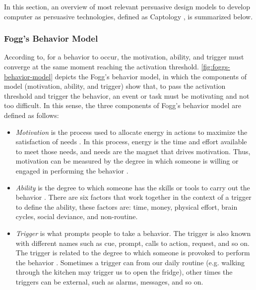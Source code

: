 In this section, an overview of most relevant persuasive design models to develop computer as persuasive technologies, defined as Captology \cite{Fogg2002}, is summarized below.

\subsubsection{Fogg's Behavior Model}
\label{subsubsec:fogg-behavior-model}

According to, for a behavior to occur, the motivation, ability, and trigger must converge at the same moment reaching the activation threshold.
\autoref{fig:foggs-behavior-model} depicts the Fogg's behavior model, in which the components of model (motivation, ability, and trigger) show that, to pass the activation threshold and trigger the behavior, an event or task must be motivating and not too difficult.
In this sense, the three components of Fogg's behavior model are defined as follows:

\begin{itemize}
\item \emph{Motivation} is the process used to allocate energy in actions to maximize the satisfaction of needs \cite{PritchardAshwood2008}.
In this process, energy is the time and effort available to meet those needs, and needs are the magnet that drives motivation. Thus, motivation can be measured by the degree in which someone is willing or engaged in performing the behavior \cite{Xu2011}.

\item \emph{Ability} is the degree to which someone has the skills or tools to carry out the behavior \cite{Xu2011}.
There are six factors that work together in the context of a trigger to define the ability, these factors are: time, money, physical effort, brain cycles, social deviance, and non-routine.

\item \emph{Trigger} is what prompts people to take a behavior. 
The trigger is also known with different names such as cue, prompt, calls to action, request, and so on.
The trigger is related to the degree to which someone is provoked to perform the behavior \cite{Xu2011}.
Sometimes a trigger can from our daily routine (e.g. walking through the kitchen may trigger us to open the fridge), other times the triggers can be external, such as alarms, messages, and so on.
\end{itemize}

